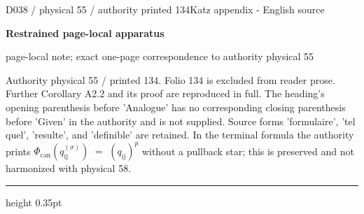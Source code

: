 \documentclass[9pt]{article}
\newcommand{\CanonText}[1]{\par{\fontsize{8.0}{9.35}\selectfont\RaggedRight #1\par}\vspace{2.2pt}}
\newcommand{\LayerTitle}{Restrained page-local apparatus}
\begin{document}
\noindent\begin{minipage}[t][\dimexpr\textheight-5pt\relax][t]{\textwidth}
{\sffamily\fontsize{7.3}{8.2}\selectfont\color{Quiet} D038 / physical 55 / authority printed 134\hfill Katz appendix - English source}
\par{}\vspace{4.5pt}
{\sffamily\fontsize{10.4}{11.6}\selectfont\bfseries\color{Accent} \LayerTitle}
\par{\sffamily\fontsize{6.7}{7.7}\selectfont\color{Quiet} page-local note; exact one-page correspondence to authority physical 55}
\vspace{5pt}
\CanonText{Authority physical 55 / printed 134. Folio 134 is excluded from reader prose. Further Corollary A2.2 and its proof are reproduced in full. The heading's opening parenthesis before 'Analogue' has no corresponding closing parenthesis before 'Given' in the authority and is not supplied. Source forms 'formulaire', 'tel quel', 'resulte', and 'definible' are retained. In the terminal formula the authority prints \(\Phi{}_{\mathrm{can}}(q_{\mathrm{ij}}^{(\sigma{})})\) \(=\) \((q_{\mathrm{ij}})^{p}\) without a pullback star; this is preserved and not harmonized with physical 58.}
\vfill
{\color{Accent}\hrule height 0.35pt}\vspace{3pt}
\end{minipage}
\newpage
\end{document}
